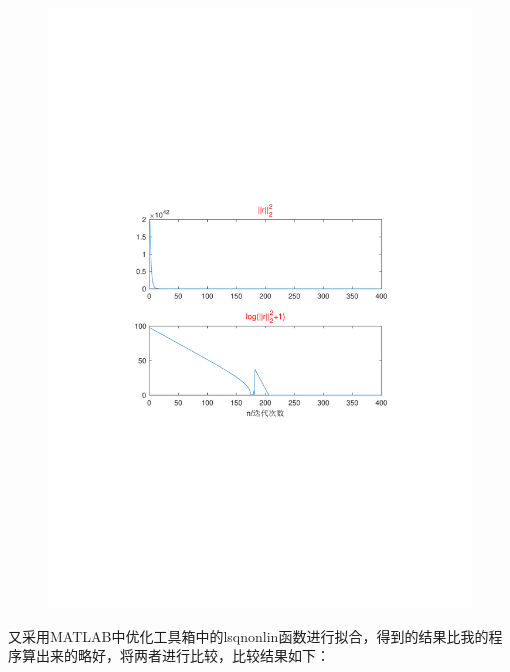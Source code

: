 \begin{figure}[H]
\centering
\includegraphics[width=12cm]{fig/6_1.pdf}
\end{figure}



又采用MATLAB中优化工具箱中的lsqnonlin函数进行拟合，得到的结果比我的程序算出来的略好，将两者进行比较，比较结果如下：

